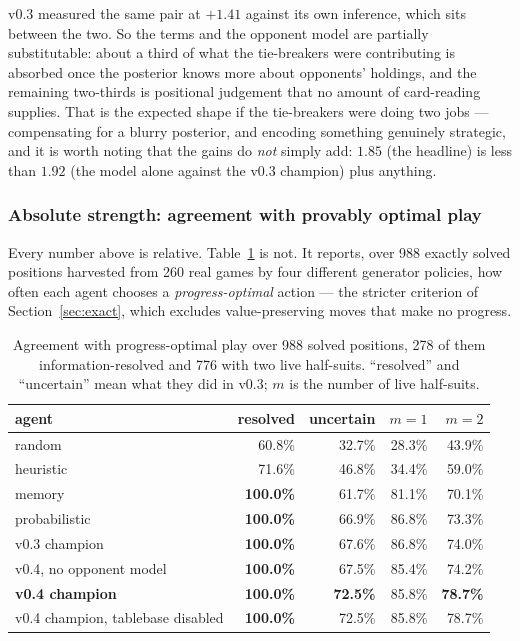 \documentclass[11pt,letterpaper]{article}
\begin{document}
v0.3 measured the same pair at $+1.41$ against its own inference, which sits
between the two. So the terms and the opponent model are partially substitutable:
about a third of what the tie-breakers were contributing is absorbed once the
posterior knows more about opponents' holdings, and the remaining two-thirds is
positional judgement that no amount of card-reading supplies. That is the
expected shape if the tie-breakers were doing two jobs --- compensating for a
blurry posterior, and encoding something genuinely strategic, and it is worth
noting that the gains do \emph{not} simply add: $1.85$ (the headline) is less
than $1.92$ (the model alone against the v0.3 champion) plus anything.

\subsubsection{Absolute strength: agreement with provably optimal play}
\label{sec:res-absolute}

Every number above is relative. Table~\ref{tab:exact} is not. It reports, over
988 exactly solved positions harvested from 260 real games by four different
generator policies, how often each agent chooses a \emph{progress-optimal}
action --- the stricter criterion of Section~\ref{sec:exact}, which excludes
value-preserving moves that make no progress.

\begin{table}[t]
\centering
\small
\begin{tabular}{lrrrr}
\toprule
agent & resolved & uncertain & $m{=}1$ & $m{=}2$ \\
\midrule
random             & 60.8\% & 32.7\% & 28.3\% & 43.9\% \\
heuristic          & 71.6\% & 46.8\% & 34.4\% & 59.0\% \\
memory             & \textbf{100.0\%} & 61.7\% & 81.1\% & 70.1\% \\
probabilistic      & \textbf{100.0\%} & 66.9\% & 86.8\% & 73.3\% \\
v0.3 champion      & \textbf{100.0\%} & 67.6\% & 86.8\% & 74.0\% \\
v0.4, no opponent model & \textbf{100.0\%} & 67.5\% & 85.4\% & 74.2\% \\
\textbf{v0.4 champion}  & \textbf{100.0\%} & \textbf{72.5\%} & 85.8\% & \textbf{78.7\%} \\
v0.4 champion, tablebase disabled & \textbf{100.0\%} & 72.5\% & 85.8\% & 78.7\% \\
\bottomrule
\end{tabular}
\caption{Agreement with progress-optimal play over 988 solved positions, 278 of
them information-resolved and 776 with two live half-suits. ``resolved'' and
``uncertain'' mean what they did in v0.3; $m$ is the number of live half-suits.}
\label{tab:exact}
\end{table}
\end{document}
